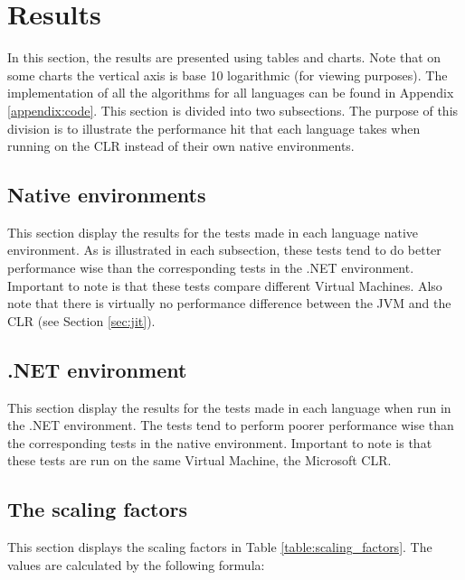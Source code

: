 \section{Results}
In this section, the results are presented using tables and charts. Note that on some charts the vertical axis is base 10 logarithmic (for viewing purposes). The implementation of all the algorithms for all languages can be found in Appendix \ref{appendix:code}. This section is divided into two subsections. The purpose of this division is to illustrate the performance hit that each language takes when running on the CLR instead of their own native environments.

\subsection{Native environments}
This section display the results for the tests made in each language native environment. As is illustrated in each subsection, these tests tend to do better performance wise than the corresponding tests in the .NET environment. Important to note is that these tests compare different Virtual Machines. Also note that there is virtually no performance difference between the JVM and the CLR (see Section \ref{sec:jit}).







\subsection{.NET environment} \label{subsec:net_environment}
This section display the results for the tests made in each language when run in the .NET environment. The tests tend to perform poorer performance wise than the corresponding tests in the native environment. Important to note is that these tests are run on the same Virtual Machine, the Microsoft CLR.









\subsection{The scaling factors}
This section displays the scaling factors in Table \ref{table:scaling_factors}. The values are calculated by the following formula:
\newline
\newline
\centerline{  }
\newline
\newline

